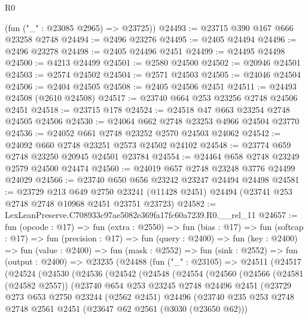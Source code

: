 \begin{lexlean}{R0}
\begin{coremodule}
      (fun ("_" : @23085 @2965) => @23725))
@24493 := @23715 @390 @167 @666 @23258 @2748
@24494 := @2496 @23276
@24495 := @2405 @24494
@24496 := @2496 @23278
@24498 := @2405 @24496 @2451
@24499 := @24495 @24498
@24500 := @4213 @24499
@24501 := @2580 @24500
@24502 := @20946 @24501
@24503 := @2574 @24502
@24504 := @2571 @24503
@24505 := @24046 @24504
@24506 := @2404 @24505
@24508 := @2405 @24506 @2451
@24511 := @24493 @24508 (@2610 @24508)
@24517 := @23740 @664 @253 @23256 @2748 @24506 @2451
@24518 := @23715 @178
@24524 := @24518 @47 @663 @23254 @2748 @24505 @24506
@24530 := @24064 @662 @2748 @23253 @4966 @24504 @23770
@24536 := @24052 @661 @2748 @23252 @2570 @24503 @24062
@24542 := @24092 @660 @2748 @23251 @2573 @24502 @24102
@24548 := @23774 @659 @2748 @23250 @20945 @24501 @23784
@24554 := @24464 @658 @2748 @23249 @2579 @24500 @24474
@24560 := @24019 @657 @2748 @23248 @3776 @24499 @24029
@24566 := @23740 @650 @656 @23242 @23247 @24494 @24498
@24581 := @23729
    @213
    @649
    @2750
    @23241
    (@11428 @2451)
    @24494
    (@23741 @253 @2748 @2748 @10968 @2451 @23751 @23723)
@24582 := LexLeanPreserve.C708933c97ae5082e369fa17fc60a7239.R0.__rel_11
@24657 := fun (opcode : @17) =>
  fun (extra : @2550) =>
  fun (bias : @17) =>
  fun (softcap : @17) =>
  fun (precision : @17) =>
  fun (query : @2400) =>
  fun (key : @2400) =>
  fun (value : @2400) =>
  fun (mask : @2552) =>
  fun (sink : @2552) =>
  fun (output : @2400) =>
  @23235
    (@24488
      (fun ("_" : @23105) =>
      @24511
        (@24517
          (@24524
            (@24530
              (@24536
                (@24542
                  (@24548
                    (@24554
                      (@24560
                        (@24566
                          (@24581 (@24582 @2557))
                          (@23740
                            @654
                            @253
                            @23245
                            @2748
                            @24496
                            @2451
                            (@23729
                              @273
                              @653
                              @2750
                              @23244
                              (@2562 @2451)
                              @24496
                              (@23740
                                @235
                                @253
                                @2748
                                @2748
                                @2561
                                @2451
                                (@23647 @62 @2561 (@3030 (@23650 @62)))

\end{coremodule}
\end{lexlean}
